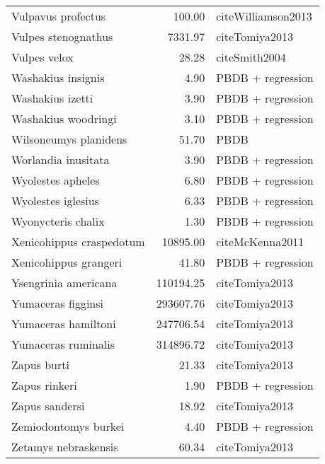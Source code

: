 \begin{table}[ht]
\begin{tabular}{lrl}
  Vulpavus profectus & 100.00 & cite{Williamson2013} \\ 
  Vulpes stenognathus & 7331.97 & cite{Tomiya2013} \\ 
  Vulpes velox & 28.28 & cite{Smith2004} \\ 
  Washakius insignis & 4.90 & PBDB + regression \\ 
  Washakius izetti & 3.90 & PBDB + regression \\ 
  Washakius woodringi & 3.10 & PBDB + regression \\ 
  Wilsoneumys planidens & 51.70 & PBDB \\ 
  Worlandia inusitata & 3.90 & PBDB + regression \\ 
  Wyolestes apheles & 6.80 & PBDB + regression \\ 
  Wyolestes iglesius & 6.33 & PBDB + regression \\ 
  Wyonycteris chalix & 1.30 & PBDB + regression \\ 
  Xenicohippus craspedotum & 10895.00 & cite{McKenna2011} \\ 
  Xenicohippus grangeri & 41.80 & PBDB + regression \\ 
  Ysengrinia americana & 110194.25 & cite{Tomiya2013} \\ 
  Yumaceras figginsi & 293607.76 & cite{Tomiya2013} \\ 
  Yumaceras hamiltoni & 247706.54 & cite{Tomiya2013} \\ 
  Yumaceras ruminalis & 314896.72 & cite{Tomiya2013} \\ 
  Zapus burti & 21.33 & cite{Tomiya2013} \\ 
  Zapus rinkeri & 1.90 & PBDB + regression \\ 
  Zapus sandersi & 18.92 & cite{Tomiya2013} \\ 
  Zemiodontomys burkei & 4.40 & PBDB + regression \\ 
  Zetamys nebraskensis & 60.34 & cite{Tomiya2013} \\ 
   \hline
\end{tabular}
\label{tab:mass_data}
\end{table}
